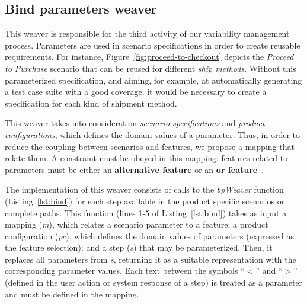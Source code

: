 \documentclass[11pt]{report}
\begin{document}



\subsection{Bind parameters weaver}\label{sub:bind-weaver}

This weaver is responsible for the third activity of our variability
management process. Parameters are used in scenario specifications 
in order to create reusable requirements. 
For instance, Figure~\ref{fig:proceed-to-checkout} depicts the \emph{Proceed to Purchase} 
scenario that can be reused for different \emph{ship methods}. Without this
parameterized specification, and aiming, for example, at automatically generating a test case suite 
with a good coverage, it would be necessary to create a specification for each kind of shipment method.

This weaver takes into consideration \emph{scenario specifications} and 
\emph{product configurations}, which defines the domain values of a
parameter. Thus, in order to reduce the coupling between scenarios and features, 
we propose a mapping that relate them. A constraint must be obeyed in this mapping: features related to parameters must be either an {\bf alternative feature} or an {\bf or feature}~\cite{gheyi-alloy-06,czarnecki-wsfactory-2005,czarnecki-book}.

The implementation of this weaver consists of calls to 
the \mbox{\emph{bpWeaver}} function (Listing~\ref{lst:bind}) for each step 
available in the product specific scenarios or complete paths. This
function (lines 1-5 of Listing~\ref{lst:bind}) takes as
input a mapping (\emph{m}), which relates a scenario parameter to a 
feature; a product configuration (\emph{pc}), which defines 
the domain values of parameters (expressed as the feature selection); and a step (\emph{s}) that may be parameterized. Then, it replaces all parameters
from \emph{s}, returning it as a suitable representation with the
corresponding parameter values. Each text between the symbols ``$<$'' and ``$>$''
(defined in the user action or system response of a
step) is treated as a parameter and must be defined in the
mapping.
\end{document}
